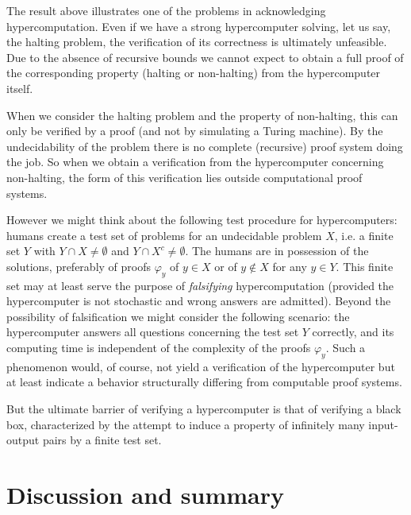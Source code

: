 \documentclass[12pt]{article}
\begin{document}
The result above illustrates one of the problems in acknowledging hypercomputation. Even if we have a strong hypercomputer solving, let us say, the halting problem, the verification of its correctness is ultimately unfeasible. Due to the absence of recursive bounds we cannot expect to obtain a full proof of the corresponding property (halting or non-halting) from the hypercomputer itself.

When we consider the halting problem and the property of non-halting, this can only be verified by a proof (and not by simulating a Turing machine). By the undecidability of the problem there is no complete (recursive) proof system doing the job. So when we obtain a verification from the hypercomputer concerning non-halting, the form of this verification lies outside computational proof systems.

However we might think about the following test procedure for hypercomputers:
humans create a test set of problems for an undecidable problem $X$,
i.e. a finite set $Y$ with $Y \cap X \neq \emptyset$ and $Y \cap X^c \neq \emptyset$.
The humans are in possession of the solutions,
preferably of proofs $\varphi_y$ of $y \in X$ or of $y \not \in X$ for any $y \in Y$.
This finite set may at least serve the purpose of {\em falsifying} hypercomputation
(provided the hypercomputer is not stochastic and wrong answers are admitted).
Beyond the possibility of falsification we might consider the following scenario:
the hypercomputer answers all questions concerning the test set $Y$ correctly,
and its computing time is independent of the complexity of the proofs $\varphi_y$.
Such a phenomenon would, of course, not yield a verification of the hypercomputer
but at least indicate a behavior structurally differing from computable proof systems.

But the ultimate barrier of verifying a hypercomputer is that of verifying a black box, characterized by the attempt to induce a property of infinitely many input-output pairs by a finite test set.

\section{Discussion and summary}
\end{document}
